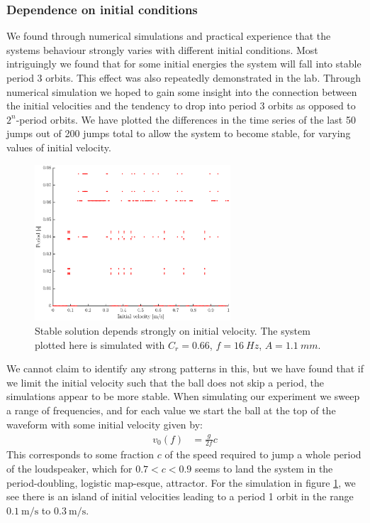 \documentclass[12pt,oneside,a4paper]{article}
\numberwithin{equation}{section}
\begin{document}
{{{{\subsubsection{Dependence on initial conditions}
We found through numerical simulations and practical experience that the systems behaviour strongly varies with different initial conditions. Most intriguingly we found that for some initial energies the system will fall into stable period 3 orbits. This effect was also repeatedly demonstrated in the lab. Through numerical simulation we hoped to gain some insight into the connection between the initial velocities and the tendency to drop into period 3 orbits as opposed to $2^n$-period orbits. We have plotted the differences in the time series of the last 50 jumps out of 200 jumps total to allow the system to become stable, for varying values of initial velocity. 
\begin{figure}[h]
\centering
\includegraphics[width=0.65\textwidth]{vsweep.eps}
\caption{Stable solution depends strongly on initial velocity. The system plotted here is simulated with $C_r=0.66$, $f=\SI{16}{Hz}$, $A=\SI{1.1}{mm}$.}
\label{vsweepsim}
\end{figure}
We cannot claim to identify any strong patterns in this, but we have found that if we limit the initial velocity such that the ball does not skip a period, the simulations appear to be more stable. When simulating our experiment we sweep a range of frequencies, and for each value we start the ball at the top of the waveform with some initial velocity given by:
\begin{align*}
v_0(f) &= \frac{g}{2f} c
\end{align*}
This corresponds to some fraction $c$ of the speed required to jump a whole period of the loudspeaker, which for $0.7<c<0.9$ seems to land the system in the period-doubling, logistic map-esque, attractor. For the simulation in figure \ref{vsweepsim}, we see there is an island of initial velocities leading to a period 1 orbit in the range $\SI{0.1}{\meter\per\second}$ to $\SI{0.3}{\meter\per\second}$.
}}}}
\end{document}
